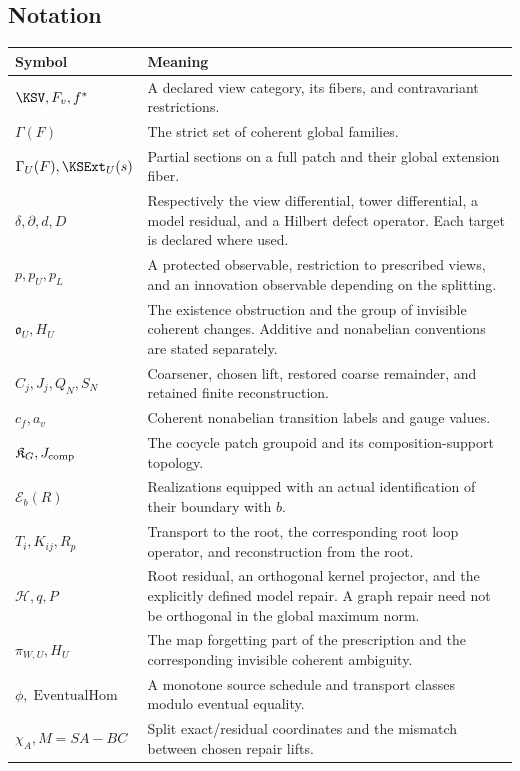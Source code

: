\documentclass[11pt,oneside,openany]{book}
\numberwithin{equation}{section}
\begin{document}
\subsection{Notation}
\begin{longtable}{@{}p{.25\linewidth}p{.7\linewidth}@{}}
\toprule
Symbol & Meaning\\\midrule\endhead
\(\KSV,F_v,f^*\) & A declared view category, its fibers, and contravariant restrictions.\\
\(\Gamma(F)\) & The strict set of coherent global families.\\
\(\Gamma_U(F),\KSExt_U(s)\) & Partial sections on a full patch and their global extension fiber.\\
\(\delta,\partial,d,D\) & Respectively the view differential, tower differential, a model residual, and a Hilbert defect operator. Each target is declared where used.\\
\(p,p_U,p_L\) & A protected observable, restriction to prescribed views, and an innovation observable depending on the splitting.\\
\(\mathfrak o_U,H_U\) & The existence obstruction and the group of invisible coherent changes. Additive and nonabelian conventions are stated separately.\\
\(C_j,J_j,Q_N,S_N\) & Coarsener, chosen lift, restored coarse remainder, and retained finite reconstruction.\\
\(c_f,a_v\) & Coherent nonabelian transition labels and gauge values.\\
\(\mathfrak K_G,J_{\rm comp}\) & The cocycle patch groupoid and its composition-support topology.\\
\(\mathcal E_b(R)\) & Realizations equipped with an actual identification of their boundary with \(b\).\\
\(T_i,K_{ij},R_p\) & Transport to the root, the corresponding root loop operator, and reconstruction from the root.\\
\(\mathcal H,q,P\) & Root residual, an orthogonal kernel projector, and the explicitly defined model repair. A graph repair need not be orthogonal in the global maximum norm.\\
\(\pi_{W,U},H_U\) & The map forgetting part of the prescription and the corresponding invisible coherent ambiguity.\\
\(\phi,\operatorname{EventualHom}\) & A monotone source schedule and transport classes modulo eventual equality.\\
\(\chi_A,M=SA-BC\) & Split exact/residual coordinates and the mismatch between chosen repair lifts.\\

\end{longtable}
\end{document}
